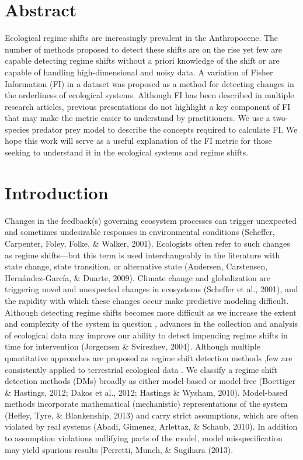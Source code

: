 \documentclass[12pt,twoside]{reedthesis}
\begin{document}
\section{Abstract}\label{abstract}

Ecological regime shifts are increasingly prevalent in the Anthropocene.
The number of methods proposed to detect these shifts are on the rise
yet few are capable detecting regime shifts without a priori knowledge
of the shift or are capable of handling high-dimensional and noisy data.
A variation of Fisher Information (FI) in a dataset was proposed as a
method for detecting changes in the orderliness of ecological systems.
Although FI has been described in multiple research articles, previous
presentations do not highlight a key component of FI that may make the
metric easier to understand by practitioners. We use a two-species
predator prey model to describe the concepts required to calculate FI.
We hope this work will serve as a useful explanation of the FI metric
for those seeking to understand it in the ecological systems and regime
shifts.

\section{Introduction}\label{introduction-1}

Changes in the feedback(s) governing ecosystem processes can trigger
unexpected and sometimes undesirable responses in environmental
conditions (Scheffer, Carpenter, Foley, Folke, \& Walker, 2001).
Ecologists often refer to such changes as regime shifts---but this term
is used interchangeably in the literature with state change, state
transition, or alternative state (Andersen, Carstensen,
Hernández-García, \& Duarte, 2009). Climate change and globalization are
triggering novel and unexpected changes in ecosystems (Scheffer et al.,
2001), and the rapidity with which these changes occur make predictive
modeling difficult. Although detecting regime shifts becomes more
difficult as we increase the extent and complexity of the system in
question , advances in the collection and analysis of ecological data
may improve our ability to detect impending regime shifts in time for
intervention (Jorgensen \& Svirezhev, 2004). Although multiple
quantitative approaches are proposed as regime shift detection methods
,few are consistently applied to terrestrial ecological data . We
classify a regime shift detection methods (DMs) broadly as either
model-based or model-free (Boettiger \& Hastings, 2012; Dakos et al.,
2012; Hastings \& Wysham, 2010). Model-based methods incorporate
mathematical (mechanistic) representations of the system (Hefley, Tyre,
\& Blankenship, 2013) and carry strict assumptions, which are often
violated by real systems (Abadi, Gimenez, Arlettaz, \& Schaub, 2010). In
addition to assumption violations nullifying parts of the model, model
misspecification may yield spurious results {[}Perretti, Munch, \&
Sugihara (2013).
\end{document}
